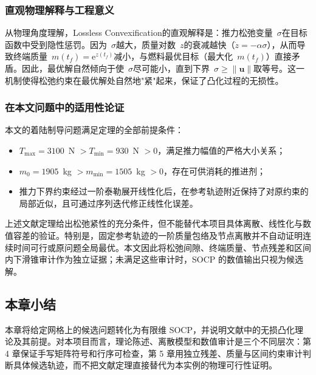 \subsubsection{直观物理解释与工程意义}

从物理角度理解，Lossless Convexification的直观解释是：推力松弛变量~$\sigma$在目标函数中受到隐性惩罚。因为~$\sigma$越大，质量对数~$z$的衰减越快（$\dot z=-\alpha\sigma$），从而导致终端质量~$m(t_f)=\mathrm{e}^{z(t_f)}$减小，与燃料最优目标（最大化~$m(t_f)$）直接矛盾。因此，最优解自然倾向于使~$\sigma$尽可能小，直到下界~$\sigma\ge\|\bm u\|$取等号。这一机制使得松弛约束在最优解处自然地"紧"起来，保证了凸化过程的无损性。

\subsubsection{在本文问题中的适用性论证}

本文的着陆制导问题满足定理的全部前提条件：
\begin{itemize}
  \item $T_{\max}=3100$~N $> T_{\min}=930$~N $>0$，满足推力幅值的严格大小关系；
  \item $m_0=1905$~kg $> m_{\min}=1505$~kg $>0$，存在可供消耗的推进剂；
  \item 推力下界约束经过一阶泰勒展开线性化后，在参考轨迹附近保持了对原约束的局部近似，且可通过序列迭代修正线性化误差。
\end{itemize}

上述文献定理给出松弛紧性的充分条件，但不能替代本项目具体离散、线性化与数值容差的验证。特别是，固定参考轨迹的一阶质量包络及节点离散并不自动证明连续时间可行或原问题全局最优。本文因此将松弛间隙、终端质量、节点残差和区间内下滑锥审计作为独立证据；未满足这些审计时，SOCP 的数值输出只视为候选解。

\subsection{本章小结}

本章将给定网格上的候选问题转化为有限维 SOCP，并说明文献中的无损凸化理论及其前提。对本项目而言，理论陈述、离散模型和数值审计是三个不同层次：第 4 章保证手写矩阵符号和行序可检查，第 5 章用独立残差、质量与区间约束审计判断具体候选轨迹，而不把文献定理直接替代为本实例的物理可行性证明。
